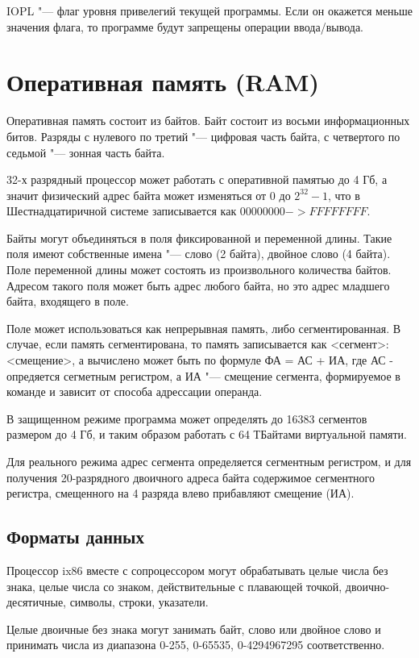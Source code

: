 IOPL "--- флаг уровня привелегий текущей программы. Если он окажется меньше значения флага, то программе будут запрещены
операции ввода/вывода. 

\section{Оперативная память (RAM)}

Оперативная память состоит из байтов. Байт состоит из восьми информационных битов. Разряды с нулевого по третий "---
цифровая часть байта, с четвертого по седьмой "--- зонная часть байта.

32-х разрядный процессор может работать с оперативной памятью до 4 Гб, а значит физический адрес байта может изменяться от 
0 до $2^32 - 1$, что в Шестнадцатиричной системе записывается как $00000000 -> FFFFFFFF$.

Байты могут объединяться в поля фиксированной и переменной длины. Такие поля имеют собственные имена "--- слово (2 байта), двойное слово (4 байта).
Поле переменной длины может состоять из произвольного количества байтов. Адресом такого поля может быть адрес любого байта,
но это адрес младшего байта, входящего в поле.

Поле может использоваться как непрерывная память, либо сегментированная. В случае, если память сегментирована, то память
записывается как <сегмент>: <смещение>, а вычислено может быть по формуле ФА = АС + ИА, где АС - опредяется сегметным регистром,
а ИА "--- смещение сегмента, формируемое в команде и зависит от способа адрессации операнда.

В защищенном режиме программа может определять до 16383 сегментов размером до 4 Гб, и таким образом работать с 
64 ТБайтами виртуальной памяти.

Для реального режима адрес сегмента определяется сегментным регистром, и для получения 20-разрядного двоичного адреса
байта содержимое сегментного регистра, смещенного на 4 разряда влево прибавляют смещение (ИА).

\subsection{Форматы данных}

Процессор ix86 вместе с сопроцессором могут обрабатывать целые числа без знака, целые числа со знаком, действительные с плавающей
точкой, двоично-десятичные, символы, строки, указатели.

Целые двоичные без знака могут занимать байт, слово или двойное слово и принимать числа из диапазона 0-255, 0-65535, 0-4294967295
соответственно.

